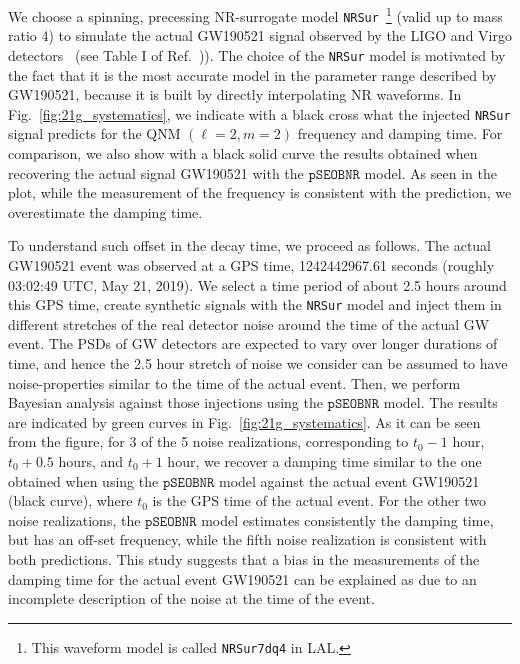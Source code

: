 \documentclass[twocolumn,prd,aps,superscriptaddress,preprintnumbers,tightenlines,showpacs,nofootinbib,eqsecnum,amsfonts,amsmath]{revtex4-1}
\newcommand{\abhi}[1]{\textcolor{Emerald}{#1}}
\newcommand{\pSEOB}{\texttt{pSEOBNR}}
\begin{document}
We choose a \abhi{spinning}, precessing NR-surrogate model \texttt{NRSur}~\footnote{This waveform model is 
called \texttt{NRSur7dq4} in LAL.} (valid up to mass ratio 4) to simulate the actual GW190521 signal
observed by the LIGO and Virgo detectors~\cite{Abbott:2020tfl} (see
Table I of Ref.~\cite{Abbott:2020tfl})). The choice of the
\texttt{NRSur} model is motivated by the fact that it is the most
accurate model in the parameter range described by GW190521, because 
it is built by directly interpolating NR waveforms. In
Fig.~\ref{fig:21g_systematics}, we indicate with a black cross what
the injected \texttt{NRSur} signal predicts for the QNM $(\ell=2,m=2)$
frequency and damping time. For comparison, we also show with a
black solid curve the results obtained when recovering the actual
signal GW190521 with the $\pSEOB$ model. As seen in the plot,
while the measurement of the frequency is consistent with the
prediction, we overestimate the damping time.

To understand such offset in the decay time, we proceed as follows.
The actual GW190521 event was observed at a GPS time, 1242442967.61
seconds (roughly 03:02:49 UTC, May 21, 2019). We select a time period
of about 2.5 hours around this GPS time, create synthetic signals 
with the \texttt{NRSur} model and inject them in different stretches
of the real detector noise around the time of the actual GW event. The
PSDs of GW detectors are expected to vary over longer durations of
time, and hence the 2.5 hour stretch of noise we consider can be
assumed to have noise-properties similar to the time of the actual
event. Then, we perform Bayesian analysis against those injections 
using the $\pSEOB$ model. The results are indicated by green curves in
Fig.~\ref{fig:21g_systematics}. As it can be seen from the figure, for
3 of the 5 noise realizations, corresponding to $t_0-1$ hour,
$t_0+0.5$ hours, and $t_0+1$ hour, we recover a damping time similar to
the one obtained when using the $\pSEOB$ model against the actual event GW190521 
(black curve), where $t_0$ is the GPS time of the actual event. For
the other two noise realizations, the $\pSEOB$ model estimates 
consistently the damping time, but has an off-set frequency, 
while the fifth noise realization is consistent with both predictions.  
This study suggests that a bias in the measurements of the damping time 
for the actual event GW190521 can be explained as due to an incomplete 
description of the noise at the time of the event.
\end{document}
